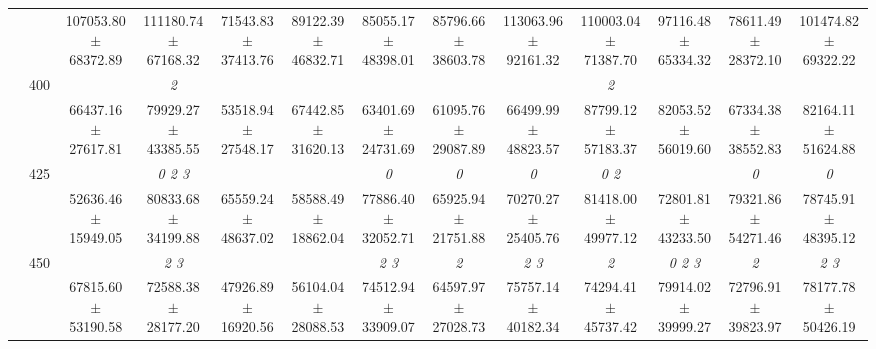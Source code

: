 \begin{table}[h]
{\begin{tabular}{
        ccccccccccccc}
 & & \cellcolor[HTML]{EFEFEF} 107053.80 $\pm$ 68372.89& \cellcolor[HTML]{EFEFEF} 111180.74 $\pm$ 67168.32& \cellcolor[HTML]{EFEFEF} 71543.83 $\pm$ 37413.76& \cellcolor[HTML]{EFEFEF} 89122.39 $\pm$ 46832.71& \cellcolor[HTML]{EFEFEF} 85055.17 $\pm$ 48398.01& \cellcolor[HTML]{EFEFEF} 85796.66 $\pm$ 38603.78& \cellcolor[HTML]{EFEFEF} 113063.96 $\pm$ 92161.32& \cellcolor[HTML]{EFEFEF} 110003.04 $\pm$ 71387.70& \cellcolor[HTML]{EFEFEF} 97116.48 $\pm$ 65334.32& \cellcolor[HTML]{EFEFEF} 78611.49 $\pm$ 28372.10& \cellcolor[HTML]{EFEFEF} 101474.82 $\pm$ 69322.22 \\ 
 & \multirow{2}{*}{400}& & \textit{ 2 }& & & & & & \textit{ 2 }& & &  \\ 
 & & 66437.16 $\pm$ 27617.81& 79929.27 $\pm$ 43385.55& 53518.94 $\pm$ 27548.17& 67442.85 $\pm$ 31620.13& 63401.69 $\pm$ 24731.69& 61095.76 $\pm$ 29087.89& 66499.99 $\pm$ 48823.57& 87799.12 $\pm$ 57183.37& 82053.52 $\pm$ 56019.60& 67334.38 $\pm$ 38552.83& 82164.11 $\pm$ 51624.88 \\ 
 & \multirow{2}{*}{425}& \cellcolor[HTML]{EFEFEF} & \cellcolor[HTML]{EFEFEF} \textit{ 0 2 3 }& \cellcolor[HTML]{EFEFEF} & \cellcolor[HTML]{EFEFEF} & \cellcolor[HTML]{EFEFEF} \textit{ 0 }& \cellcolor[HTML]{EFEFEF} \textit{ 0 }& \cellcolor[HTML]{EFEFEF} \textit{ 0 }& \cellcolor[HTML]{EFEFEF} \textit{ 0 2 }& \cellcolor[HTML]{EFEFEF} & \cellcolor[HTML]{EFEFEF} \textit{ 0 }& \cellcolor[HTML]{EFEFEF} \textit{ 0 } \\ 
 & & \cellcolor[HTML]{EFEFEF} 52636.46 $\pm$ 15949.05& \cellcolor[HTML]{EFEFEF} 80833.68 $\pm$ 34199.88& \cellcolor[HTML]{EFEFEF} 65559.24 $\pm$ 48637.02& \cellcolor[HTML]{EFEFEF} 58588.49 $\pm$ 18862.04& \cellcolor[HTML]{EFEFEF} 77886.40 $\pm$ 32052.71& \cellcolor[HTML]{EFEFEF} 65925.94 $\pm$ 21751.88& \cellcolor[HTML]{EFEFEF} 70270.27 $\pm$ 25405.76& \cellcolor[HTML]{EFEFEF} 81418.00 $\pm$ 49977.12& \cellcolor[HTML]{EFEFEF} 72801.81 $\pm$ 43233.50& \cellcolor[HTML]{EFEFEF} 79321.86 $\pm$ 54271.46& \cellcolor[HTML]{EFEFEF} 78745.91 $\pm$ 48395.12 \\ 
 & \multirow{2}{*}{450}& & \textit{ 2 3 }& & & \textit{ 2 3 }& \textit{ 2 }& \textit{ 2 3 }& \textit{ 2 }& \textit{ 0 2 3 }& \textit{ 2 }& \textit{ 2 3 } \\ 
 & & 67815.60 $\pm$ 53190.58& 72588.38 $\pm$ 28177.20& 47926.89 $\pm$ 16920.56& 56104.04 $\pm$ 28088.53& 74512.94 $\pm$ 33909.07& 64597.97 $\pm$ 27028.73& 75757.14 $\pm$ 40182.34& 74294.41 $\pm$ 45737.42& 79914.02 $\pm$ 39999.27& 72796.91 $\pm$ 39823.97& 78177.78 $\pm$ 50426.19 \\ 

\end{tabular}}
\end{table}
